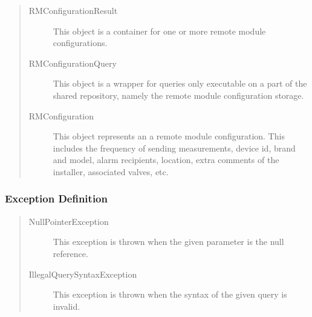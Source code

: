 \begin{quote}
	\begin{description}
		\item[RMConfigurationResult] This object is a container for one or more remote module
		configurations.
		\item[RMConfigurationQuery] This object is a wrapper for queries only executable on a
		part of the shared repository, namely the remote module configuration storage.
		\item[RMConfiguration] This object represents an a remote module
		configuration. This includes the frequency of sending measurements, device id,
		brand and model, alarm recipients, location, extra comments of the installer,
		associated valves, etc.
	\end{description} 
\end{quote}

\subsubsection{Exception Definition} 

\begin{quote}
	\begin{description}
		\item[NullPointerException] This exception is thrown when the given parameter
		is the null reference.
		\item[IllegalQuerySyntaxException] This exception is thrown when the syntax of
		the given query is invalid.
	\end{description} 
\end{quote}